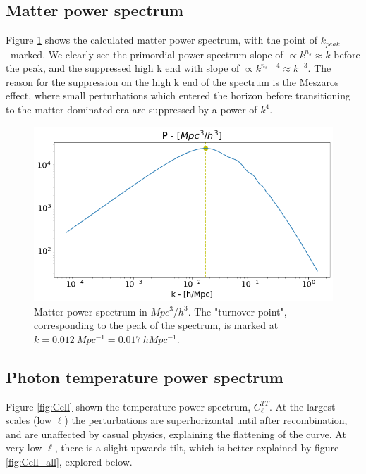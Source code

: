 \documentclass[10pt, a4paper]{article}
\begin{document}
\subsection{Matter power spectrum}
Figure \ref{fig:MatterPower} shows the calculated matter power spectrum, with the point of $k_{peak}$ marked. We clearly see the primordial power spectrum slope of $\propto k^{n_s} \approx k$ before the peak, and the suppressed high k end with slope of $\propto k^{n_s-4} \approx k^{-3}$. The reason for the suppression on the high k end of the spectrum is the Meszaros effect, where small perturbations which entered the horizon before transitioning to the matter dominated era are suppressed by a power of $k^4$.

\begin{figure}[H]
    \centering
    \includegraphics[scale=0.5]{../m4_figs/MatterPower.png}
    \caption{Matter power spectrum in $Mpc^3/h^3$. The "turnover point", corresponding to the peak of the spectrum, is marked at $k=\SI{0.012}{Mpc^{-1}} = \SI{0.017}{h Mpc^{-1}}$.}
    \label{fig:MatterPower}
\end{figure}



\subsection{Photon temperature power spectrum}
Figure \ref{fig:Cell} shown the temperature power spectrum, $C_\ell^{TT}$. At the largest scales (low $\ell$) the perturbations are superhorizontal until after recombination, and are unaffected by casual physics, explaining the flattening of the curve. At very low $\ell$, there is a slight upwards tilt, which is better explained by figure \ref{fig:Cell_all}, explored below.
\end{document}
